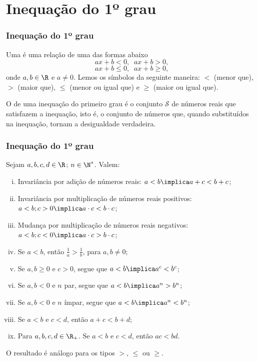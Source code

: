 
\section{Inequação do 1º grau}
\begin{frame}
\frametitle{Inequação do 1º grau} 

\begin{definicao}
Uma  é uma relação de uma das formas
abaixo $$ax+b <0, \; \; ax+b>0,$$ $$ax+b \leq 0, \; \; ax+b \geq
0,$$ onde $a, b \in \R$ e $ a \neq 0$. Lemos os símbolos da seguinte
maneira: $<$ (menor que), $>$ (maior que), $\leq$ (menor ou igual
que) e $\geq$ (maior ou igual que).
\end{definicao}

O  de uma inequação do primeiro grau é o
conjunto $\mathcal{S}$ de números reais que satisfazem a inequação,
isto é, o conjunto de números que, quando substituídos na inequação,
tornam a desigualdade verdadeira.

\end{frame}


\begin{frame}
\frametitle{Inequação do 1º grau} 

\begin{proposicao}
Sejam $a, b, c, d \in \R$; $n \in \N^*$. Valem:
\begin{enumerate}[i.]
	\item Invariância por adição de números reais: $a < b \implica a+c < b+c$;
	\item Invariância por multiplicação de números reais positivos:
	$a < b ; c>0 \implica a \cdot c < b \cdot c$;
	\item Mudança por multiplicação de números reais
	negativos: $a < b ; c<0 \implica a \cdot c > b \cdot c$;
	\item Se $a < b$, então $\frac 1 a > \frac 1 b$, para $a, b \neq
	0$;
	\item Se $a,b \geq 0$ e $c>0$, segue que $a < b \implica a^c < b^c$;
	\item Se $a,b < 0$ e $n$ par, segue que $a < b \implica a^n > b^n$;
	\item Se $a,b < 0$ e $n$ ímpar, segue que $a < b \implica a^n <
	b^n$;
	\item Se $a< b$ e $c< d$, então $a+c < b+d$;
	\item Para $a, b, c, d \in \R_+$. Se $a< b$ e $c< d$, então $ac < bd$.
\end{enumerate}
O resultado é análogo para os tipos $>$, $\leq$ ou $\geq$.
\end{proposicao}


\end{frame}


